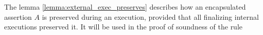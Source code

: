 The lemma \ref{lemma:external_exec_preserves} describes how an encapsulated assertion $A$ is preserved during an execution, provided that all finalizing internal executions preserved it. 
It will be used in the proof of soundness of the rule {}


%
%

 


